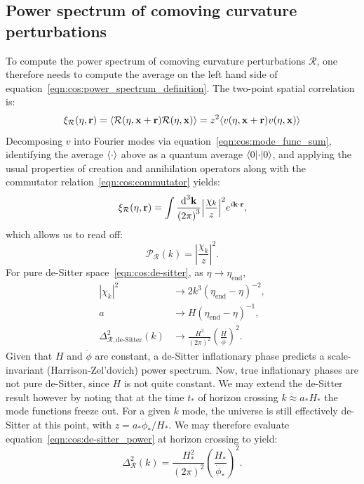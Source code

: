 \subsection{Power spectrum of comoving curvature perturbations}
To compute the power spectrum of comoving curvature perturbations $\mathcal{R}$, one therefore needs to compute the average on the left hand side of equation~\eqref{eqn:cos:power_spectrum_definition}. The two-point spatial correlation is:
\begin{equation}
  \xi_\mathcal{R}(\eta,\vr) = \mean{\mathcal{R}(\eta,\vx+\vr)\mathcal{R}(\eta,\vx)} = z^2\mean{v(\eta,\vx+\vr)v(\eta,\vx)}
\end{equation}
Decomposing $v$ into Fourier modes via equation~\eqref{eqn:cos:mode_func_sum}, identifying the average $\mean{\cdot}$ above as a quantum average $\bracket{0}{\cdot}{0}$, and applying the usual properties of creation and annihilation operators along with the commutator relation~\eqref{eqn:cos:commutator} yields:
\begin{equation}
  \xi_\mathcal{R}(\eta,\vr) = \int \frac{\d[3]{\vk}}{{(2\pi)}^3} {\left|\frac{\chi_k}{z}\right|}^2 e^{i\vk\cdot\vr}, 
\end{equation}
which allows us to read off:
\begin{equation}
  \mathcal{P}_\mathcal{R}(k) = {\left|\frac{\chi_k}{z}\right|}^2.
\end{equation}
For pure de-Sitter space~\eqref{eqn:cos:de-sitter}, as $\eta\to\eta_\mathrm{end}$,
\begin{align}
  |\chi_k|^2 &\rightarrow 2k^3 {(\eta_\mathrm{end}-\eta)}^{-2},\nonumber\\
  a& \rightarrow H{(\eta_\mathrm{end}-\eta)}^{-1}, \nonumber\\
  \Delta_{\mathcal{R},\text{de-Sitter}}^2(k) &\rightarrow \frac{H^2}{{(2\pi)}^2}{\left( \frac{H}{\dot{\phi}} \right)}^2.
  \label{eqn:cos:de-sitter_power}
\end{align}
Given that $H$ and $\dot{\phi}$ are constant, a de-Sitter inflationary phase predicts a scale-invariant (Harrison-Zel'dovich) power spectrum. Now, true inflationary phases are not pure de-Sitter, since $H$ is not quite constant. We may extend the de-Sitter result however by noting that at the time $t_*$ of horizon crossing  $k\approx a_*H_*$ the mode functions freeze out. For a given $k$ mode, the universe is still effectively de-Sitter at this point, with $z=a_*\dot{\phi}_*/H_*$. We may therefore evaluate equation~\eqref{eqn:cos:de-sitter_power} at horizon crossing to yield:
\begin{equation}
  \Delta_\mathcal{R}^2(k) = \frac{H_*^2}{{(2\pi)}^2}{\left( \frac{H_*}{\dot{\phi}_*} \right)}^2.
  \label{eqn:cos:inflation_power}
\end{equation}

